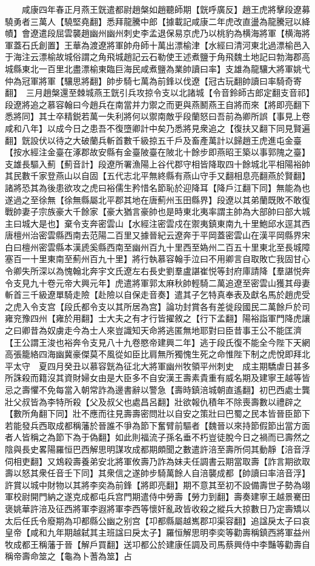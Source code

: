 　　咸康四年春正月燕王皝遣都尉趙槃如趙聽師期【皝呼廣反】趙王虎將擊段遼募驍勇者三萬人【驍堅堯翻】悉拜龍騰中郎【據載記咸康二年虎改直盪為龍騰冠以絳幘】會遼遣段屈雲襲趙幽州幽州刺史李孟退保易京虎乃以桃豹為横海將軍【横海將軍蓋石氏創置】王華為渡遼將軍帥舟師十萬出漂榆津【水經曰清河東北過漂榆邑入于海注云漂榆故城俗謂之角飛城趙記云石勒使王述煮鹽于角飛魏土地記曰勃海郡高城縣東北一百里北盡漂榆東臨巨海民咸煮鹽為業帥讀曰率】支雄為龍驤大將軍姚弋仲為冠軍將軍【驤思將翻】帥步騎七萬為前鋒以伐遼【冠古玩翻帥讀曰率騎奇寄翻】　三月趙槃還至棘城燕王皝引兵攻掠令支以北諸城【令音鈴師古郎定翻支音祁】段遼將追之慕容翰曰今趙兵在南當并力禦之而更與燕鬭燕王自將而來【將即亮翻下悉將同】其士卒精鋭若萬一失利將何以禦南敵乎段蘭怒曰吾前為卿所誤【事見上卷咸和八年】以成今日之患吾不復墮卿計中矣乃悉將見衆追之【復扶又翻下同見賢遍翻】皝設伏以待之大破蘭兵斬首數千級掠五千戶及畜產萬計以歸趙王虎進屯金臺【按水經注金臺在涿郡故安縣有金臺陂臺在陂北十餘步即燕昭王築以事郭隗之臺】支雄長驅入薊【薊音計】段遼所署漁陽上谷代郡守相皆降取四十餘城北平相陽裕帥其民數千家登燕山以自固【五代志北平無終縣有燕山守手又翻相息亮翻燕於賢翻】諸將恐其為後患欲攻之虎曰裕儒生矜惜名節恥於迎降耳【降戶江翻下同】無能為也遂過之至徐無【徐無縣屬北平郡其地在唐薊州玉田縣界】段遼以其弟蘭既敗不敢復戰帥妻子宗族豪大千餘家【豪大猶言豪帥也是時東北夷率謂主帥為大部帥曰部大城主曰城大是也】棄令支奔密雲山【水經注密雲戍在禦夷鎮東南九十里鮑邱水逕其西唐檀州治密雲縣西南去范陽二百里又據晉紀云遼奔于平岡蓋密雲山在漢平岡縣界宋白曰檀州密雲縣本漢虒奚縣西南至幽州百九十里西至媯州二百五十里東北至長城障塞百一十里東南至薊州百九十里】將行執慕容翰手泣曰不用卿言自取敗亡我固甘心令卿失所深以為愧翰北奔宇文氏遼左右長史劉羣盧諶崔悦等封府庫請降【羣諶悦奔令支見九十卷元帝大興元年】虎遣將軍郭太麻秋帥輕騎二萬追遼至密雲山獲其母妻斬首三千級遼單騎走險【赴險以自保走音奏】遣其子乞特真奉表及獻名馬於趙虎受之虎入令支宫【段氏都令支以其所居為宫】論功封賞各有差徙段國民二萬餘戶於司雍兖豫四州【雍於用翻】士大夫之有才行皆擢敘之【行下孟翻】陽裕詣軍門降虎讓之曰卿昔為奴虜走今為士人來豈識知天命將逃匿無地耶對曰臣昔事王公不能匡濟【王公謂王浚也裕奔令支見八十九卷愍帝建興二年】逃于段氏復不能全今陛下天網高張籠絡四海幽冀豪傑莫不風從如臣比肩無所獨愧生死之命惟陛下制之虎悅即拜北平太守　夏四月癸丑以慕容皝為征北大將軍幽州牧領平州刺史　成主期驕虐日甚多所誅殺而籍沒其資財婦女由是大臣多不自安漢王壽素貴重有威名期及建寧王越等皆忌之壽懼不免每當入朝常詐為邊書辭以警急【壽時鎮涪城朝直遙翻】初巴西處士龔壯父叔皆為李特所殺【父及叔父也處昌呂翻】壯欲報仇積年不除喪壽數以禮辟之【數所角翻下同】壯不應而往見壽壽密問壯以自安之策壯曰巴蜀之民本皆晉臣節下若能發兵西取成都稱藩於晉誰不爭為節下奮臂前驅者【魏晉以來持節假節出當方面者人皆稱之為節下為于偽翻】如此則福流子孫名垂不朽豈徒脫今日之禍而已壽然之陰與長史畧陽羅恒巴西解思明謀攻成都期頗聞之數遣許涪至壽所伺其動靜【涪音浮伺相吏翻】又鴆殺壽養弟安北將軍攸壽乃詐為妹夫任調書云期當取壽【詐言期欲取壽以怒其衆任音壬下同】其衆信之遂帥步騎萬餘人自涪襲成都【帥讀曰率涪音浮】許賞以城中財物以其將李奕為前鋒【將即亮翻】期不意其至初不設備壽世子勢為翊軍校尉開門納之遂克成都屯兵宫門期遣侍中勞壽【勞力到翻】壽奏建寧王越景騫田褒姚華許涪及征西將軍李遐將軍李西等懷奸亂政皆收殺之縱兵大掠數日乃定壽矯以太后任氏令廢期為卭都縣公幽之别宫【卭都縣屬越嶲郡卭渠容翻】追諡戾太子曰哀皇帝【咸和九年期越弑其主班諡曰戾太子】羅恒解思明李奕等勸壽稱鎮西將軍益州牧成都王稱藩于晉【解戶買翻】送卭都公於建康任調及司馬蔡興侍中李豔等勸壽自稱帝壽命筮之【龜為卜蓍為筮】占